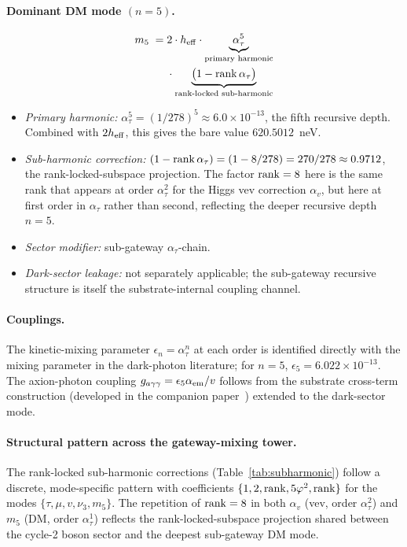 ﻿\documentclass[reprint,amsmath,amssymb,aps,prd,longbibliography,floatfix]{revtex4-2}
\begin{document}
\paragraph{Dominant DM mode $(n = 5)$.}
\begin{align*}
m_5 \;=\;& 2 \cdot h_{\rm eff} \cdot \underbrace{\alpha_\tau^5}_{\text{primary harmonic}} \\
        &\cdot \underbrace{\bigl(1 - {\rm rank}\, \alpha_\tau\bigr)}_{\text{rank-locked sub-harmonic}}
\end{align*}
\begin{itemize}
\item \emph{Primary harmonic:} $\alpha_\tau^5 = (1/278)^5 \approx 6.0
\times 10^{-13}$, the fifth recursive depth. Combined with $2 h_{\rm
eff}$, this gives the bare value $620.5012$~neV.
\item \emph{Sub-harmonic correction:} $(1 - {\rm rank}\,\alpha_\tau) =
(1 - 8/278) = 270/278 \approx 0.9712$, the rank-locked-subspace
projection. The factor ${\rm rank} = 8$ here is the same rank that
appears at order $\alpha_\tau^2$ for the Higgs vev correction
$\alpha_v$, but here at first order in $\alpha_\tau$ rather than
second, reflecting the deeper recursive depth $n = 5$.
\item \emph{Sector modifier:} sub-gateway $\alpha_\tau$-chain.
\item \emph{Dark-sector leakage:} not separately applicable; the
sub-gateway recursive structure is itself the substrate-internal
coupling channel.
\end{itemize}

\paragraph{Couplings.}
The kinetic-mixing parameter $\epsilon_n = \alpha_\tau^n$ at each
order is identified directly with the mixing parameter in the dark-photon
literature; for $n = 5$, $\epsilon_5 = 6.022 \times 10^{-13}$. The
axion-photon coupling $g_{a\gamma\gamma} = \epsilon_5 \alpha_{\rm em}/v$
follows from the substrate cross-term construction
(developed in the companion paper~\cite{UnreasonableEffectiveness})
extended to the dark-sector mode.

\paragraph{Structural pattern across the gateway-mixing tower.}
The rank-locked sub-harmonic corrections (Table~\ref{tab:subharmonic})
follow a discrete, mode-specific pattern with coefficients
$\{1, 2, {\rm rank}, 5\varphi^2, {\rm rank}\}$ for the modes
$\{\tau, \mu, v, \nu_3, m_5\}$. The repetition of ${\rm rank} = 8$ in
both $\alpha_v$ (vev, order $\alpha_\tau^2$) and $m_5$ (DM, order
$\alpha_\tau^1$) reflects the rank-locked-subspace projection
shared between the cycle-2 boson sector and the deepest
sub-gateway DM mode.
\end{document}
